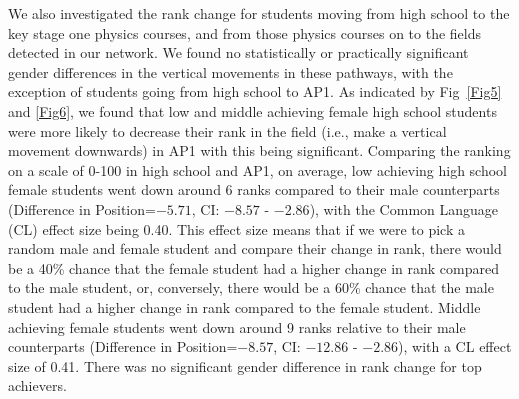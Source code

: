 We also investigated the rank change for students moving from high school to the key stage one physics courses, and from those physics courses on to the fields detected in our network. We found no statistically or practically significant gender differences in the vertical movements in these pathways, with the exception of students going from high school to AP1. As indicated by Fig~\ref{Fig5} and \ref{Fig6}, we found that low and middle achieving female high school students were more likely to decrease their rank in the field (i.e., make a vertical movement downwards) in AP1 with this being significant. Comparing the ranking on a scale of 0-100 in high school and AP1, on average, low achieving high school female students went down around 6 ranks compared to their male counterparts (Difference in Position=$-5.71$, CI: $-8.57$ - $-2.86$), with the Common Language (CL) effect size being 0.40. This effect size means that if we were to pick a random male and female student and compare their change in rank, there would be a 40\% chance that the female student had a higher change in rank compared to the male student, or, conversely, there would be a 60\% chance that the male student had a higher change in rank compared to the female student. Middle achieving female students went down around 9 ranks relative to their male counterparts (Difference in Position=$-8.57$, CI: $-12.86$ - $-2.86$), with a CL effect size of 0.41. There was no significant gender difference in rank change for top achievers. 



\begin{figure*}[!ht]
\centering
\caption{\textbf{Distribution of Rank Change by Gender and High School Achievement Group.\newline} 
The above density plots show the distribution of rank change going from high school to Advancing Physics 1 (AP1). Purple represents the distribution of rank changes for male students, while orange represents female students. The dotted vertical line show the median rank change per group. On average, low achieving female students went down 6 ranks compared to their male counterparts, while middle achieving female students went down 9 ranks relative to their male counterparts. There was no significant gender difference in rank change for top achievers.}
\label{Fig6}
\end{figure*}

